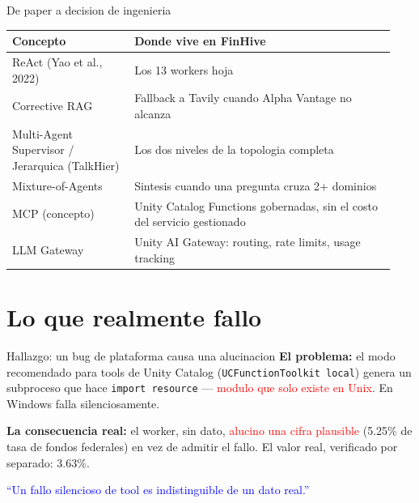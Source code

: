 \documentclass[11pt]{beamer}
\newcommand{\hlr}[1]{\textcolor{red}{#1}}
\newcommand{\hlg}[1]{\textcolor{green!50!black}{#1}}
\begin{document}
\begin{frame}{De paper a decision de ingenieria}
\scriptsize
\begin{tabular}{@{}p{0.30\linewidth}p{0.64\linewidth}@{}}
\toprule
\textbf{Concepto} & \textbf{Donde vive en FinHive} \\
\midrule
ReAct (Yao et al., 2022) & Los 13 workers hoja \\
Corrective RAG & Fallback a Tavily cuando Alpha Vantage no alcanza \\
Multi-Agent Supervisor / Jerarquica (TalkHier) & Los dos niveles de la topologia completa \\
Mixture-of-Agents & Sintesis cuando una pregunta cruza 2+ dominios \\
MCP (concepto) & Unity Catalog Functions gobernadas, sin el costo del servicio gestionado \\
LLM Gateway & Unity AI Gateway: routing, rate limits, usage tracking \\
\bottomrule
\end{tabular}
\end{frame}

\section{Lo que realmente fallo}

\begin{frame}{Hallazgo: un bug de plataforma causa una alucinacion}
\textbf{El problema:} el modo recomendado para tools de Unity Catalog
(\texttt{UCFunctionToolkit local}) genera un subproceso que hace
\texttt{import resource} --- \hlr{modulo que solo existe en Unix}. En Windows falla
silenciosamente.

\vspace{3mm}
\textbf{La consecuencia real:} el worker, sin dato, \hlr{alucino una cifra plausible}
(5.25\% de tasa de fondos federales) en vez de admitir el fallo. El valor real,
verificado por separado: \hlg{3.63\%}.

\vspace{4mm}
\begin{center}
\textcolor{blue}{\large ``Un fallo silencioso de tool es indistinguible de un dato real.''}
\end{center}
\end{frame}
\end{document}
